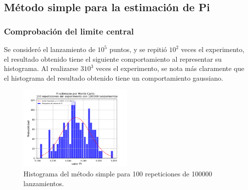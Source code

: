 \documentclass{rbf}
\begin{document}
\subsection{Método simple para la estimación de Pi}
\subsubsection{Comprobación del limite central}
Se consideró el lanzamiento de $10^5$ puntos, y se repitió $10^2$ veces el experimento, el resultado obtenido tiene el siguiente comportamiento al representar su histograma. Al realizarse $3 10^3$ veces el experimento, se nota más claramente que el histograma del resultado obtenido tiene un comportamiento gaussiano. 
\begin{figure}[h]
 \centering
  \includegraphics[width=0.5\textwidth]{figures/MCn1e5m100.png}
	\caption{Histograma del método simple para 100 repeticiones de 100000 lanzamientos.}
 \label{buff1}
\end{figure}
\end{document}
